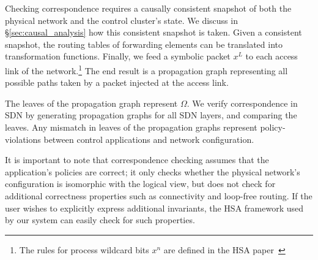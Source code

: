 
Checking correspondence requires a causally consistent
snapshot of both the physical network and the
control cluster's state. We discuss in \S\ref{sec:causal_analysis} how this consistent snapshot
is taken. Given a consistent
snapshot, the routing
tables of forwarding elements can be translated into transformation functions.
Finally, we feed a symbolic packet $x^L$ to each access link of the
network.\footnote{The rules for process wildcard bits $x^n$ are defined in
the HSA paper~\cite{hsa}} The end result is a propagation graph representing all possible paths taken by a packet injected
at the access link.

The leaves of the propagation graph represent $\Omega$. We
verify correspondence in SDN by generating propagation graphs for all SDN layers,
and comparing the leaves. Any mismatch in leaves of the propagation graphs
represent policy-violations between control applications and network
configuration.

It is important to note that correspondence checking assumes that the
application's policies are correct; it only checks whether the physical
network's configuration is isomorphic with the logical view, but does not
check for additional correctness properties such as connectivity and
loop-free routing. If the user wishes to explicitly express additional
invariants, the HSA framework used by our system can
easily check for such properties.

